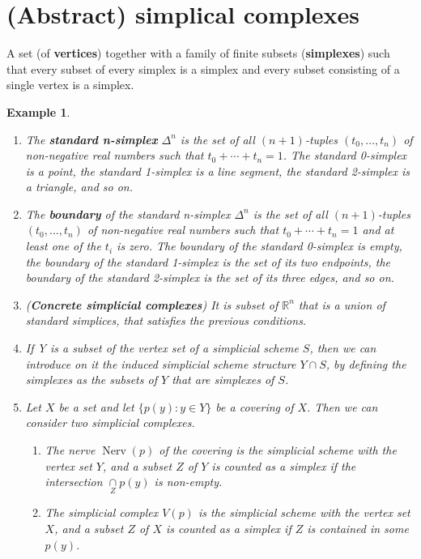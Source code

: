 \documentclass{book}
\newtheorem{example}{Example}
\begin{document}
\section{(Abstract) simplical complexes}

A set (of \textbf{vertices}) together with a  family of finite subsets (\textbf{simplexes}) such that every subset of every simplex is a simplex and every subset consisting of a single vertex is a simplex.  

\begin{example}
    \begin{enumerate}
        \item The \textbf{standard n-simplex} $\Delta^n$ is the set of all $(n+1)$-tuples $(t_0, \ldots, t_n)$ of non-negative real numbers such that $t_0 + \cdots + t_n = 1$. The standard 0-simplex is a point, the standard 1-simplex is a line segment, the standard 2-simplex is a triangle, and so on.

        \item The \textbf{boundary} of the standard n-simplex $\Delta^n$ is the set of all $(n+1)$-tuples $(t_0, \ldots, t_n)$ of non-negative real numbers such that $t_0 + \cdots + t_n = 1$ and at least one of the $t_i$ is zero. The boundary of the standard 0-simplex is empty, the boundary of the standard 1-simplex is the set of its two endpoints, the boundary of the standard 2-simplex is the set of its three edges, and so on.

        \item (\textbf{Concrete simplicial complexes}) It is subset of $\mathbb{R}^n$ that is a union of standard simplices, that satisfies the previous conditions.

        \item If Y is a subset of the vertex set of a simplicial scheme $S$, then we can introduce on it the induced simplicial scheme structure $ Y \cap S$, by defining the simplexes as the subsets of $ Y $ that are simplexes of $S$.  

        \item Let $X$ be a set and let $\{p(y): y \in Y\}$ be a covering of $X$. Then we can consider two simplicial complexes. 
        \begin{enumerate}
            \item The nerve $\operatorname{Nerv}(p)$ of the covering is the simplicial scheme with the vertex set $Y$, and a subset $Z$ of $Y$ is counted as a simplex if the intersection $\underset{Z}{\cap} p(y)$ is non-empty. 
            \item The simplicial complex $V(p)$ is the simplicial scheme with the vertex set $X$, and a subset $Z$ of $X$ is counted as a simplex if $Z$ is contained in some $p(y)$.
        \end{enumerate}
    \end{enumerate}
\end{example}
\end{document}
